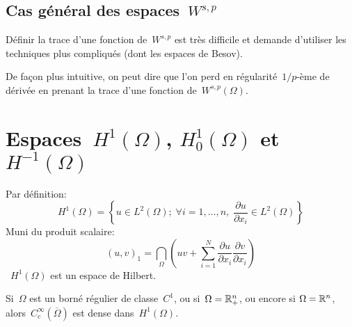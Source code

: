 \medskip
\subsection{Cas général des espaces~$W^{s,p}$}

Définir la trace d'une fonction de~$W^{s,p}$ est très difficile et demande d'utiliser les techniques
plus compliqués (dont les espaces de Besov).

De façon plus intuitive, on peut dire que l'on perd en régularité~$1/p$-ème de dérivée en prenant
la trace d'une fonction de~$W^{s,p}(\Omega)$.






\medskip
\section{Espaces~$H^1(\Omega)$, $H^1_0(\Omega)$ et~$H^{-1}(\Omega)$}

Par définition:
\begin{equation}
H^1(\Omega)=\left\lbrace u\in L^2(\Omega);\; \forall i =1,\ldots,n,\; \frac{\partial u}{\partial x_i}\in L^2(\Omega) \right\rbrace
\end{equation}
Muni du produit scalaire:
\begin{equation}(u,v)_1 = \dint_{\Omega} \left(uv + \sum_{i=1}^N \frac{\partial u}{\partial x_i} \frac{\partial v}{\partial x_i} \right )\end{equation}~$H^1(\Omega)$ est un espace de Hilbert.



\medskip
\begin{theoreme}
Si~$\Omega$ est un borné régulier de classe~$C^1$, ou si~$\Omega=\mathbb R^n_+$, ou encore si
$\Omega=\mathbb R^n$, alors~$C_c^\infty(\overline{\Omega})$ est dense dans~$H^1(\Omega)$.
\end{theoreme}

